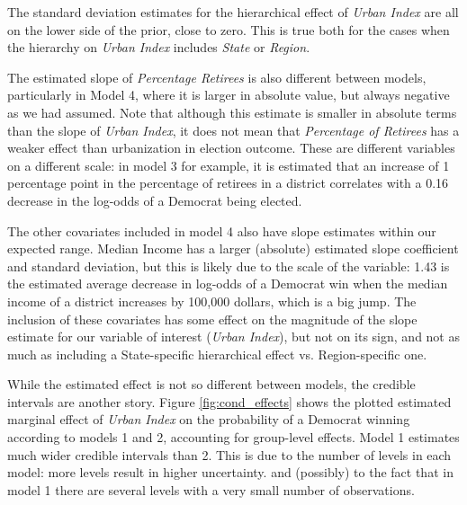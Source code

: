 \documentclass[12pt]{article}
\begin{document}
The standard deviation estimates for the hierarchical effect of \textit{Urban Index}  are all on the lower side of the prior, close to zero. This is true both for the cases when the hierarchy on \textit{Urban Index} includes \textit{State} or \textit{Region}.


The estimated slope of \textit{Percentage Retirees} is also different between models, particularly in Model 4, where it is larger in absolute value, but always negative as we had assumed. Note that although this estimate is smaller in absolute terms than the slope of \textit{Urban Index}, it does not mean that \textit{Percentage of Retirees} has a weaker effect than urbanization in election outcome. These are different variables on a different scale: in model 3 for example, it is estimated that an increase of 1 percentage point in the percentage of retirees in a district correlates with a 0.16 decrease in the log-odds of a Democrat being elected.

The other covariates included in model 4 also have slope estimates within our expected range.
Median Income has a larger (absolute) estimated slope coefficient and standard deviation, but this is likely due to the scale of the variable: 1.43 is the estimated average decrease in log-odds of a Democrat win when the median income of a district increases by 100,000 dollars, which is a big jump. The inclusion of these covariates has some effect on the magnitude of the slope estimate for our variable of interest (\textit{Urban Index}), but not on its sign, and not as much as including a State-specific hierarchical effect vs. Region-specific one.




While the estimated effect is not so different between models, the credible intervals are another story. Figure \ref{fig:cond_effects} shows the plotted estimated marginal effect of \textit{Urban Index} on the probability of a Democrat winning according to models 1 and 2, accounting for group-level effects. Model 1 estimates much wider credible intervals than 2. This is due to the number of levels in each model: more levels result in higher uncertainty.
and (possibly) to the fact that in model 1 there are several levels with a very small number of observations.
\end{document}
